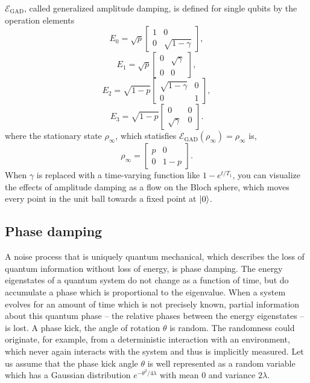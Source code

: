 \documentclass[11pt, oneside]{article}   	%
\begin{document}
$\mathcal{E}_{\textrm{GAD}}$, called generalized amplitude damping, is defined for single qubits by the operation elements
\begin{equation}
E_0 = \sqrt{p}
\begin{bmatrix}
1 & 0 \\
0 & \sqrt{1 - \gamma}
\end{bmatrix}, 
\end{equation}
\begin{equation}
E_1 = \sqrt{p}
\begin{bmatrix}
0 & \sqrt{\gamma} \\
0 & 0
\end{bmatrix},
\end{equation}
\begin{equation}
E_2 = \sqrt{1-p}
\begin{bmatrix}
\sqrt{1 - \gamma} & 0 \\
0 & 1
\end{bmatrix},
\end{equation}
\begin{equation}
E_3 = \sqrt{1-p}
\begin{bmatrix}
0 &0 \\
\sqrt{\gamma} & 0
\end{bmatrix}.
\end{equation}
where the stationary state $\rho_{\infty}$, which statisfies $\mathcal{E}_{\textrm{GAD}} (\rho_{\infty}) = \rho_{\infty}$ is,
\begin{equation}
\rho_{\infty} = 
\begin{bmatrix}
p &0 \\
0 & 1-p
\end{bmatrix}.
\end{equation}
When $\gamma$ is replaced with a time-varying function like $1-e^{t/T_1}$, you can visualize the effects of amplitude damping as a flow on the Bloch sphere, which moves every point in the unit ball towards a fixed point at $\ket{0}$.

\subsection{Phase damping}
A noise process that is uniquely quantum mechanical, which describes the loss of quantum information without loss of energy, is phase damping. 
The energy eigenstates of a quantum system do not change as a function of time, but do accumulate a phase which is proportional to the eigenvalue. 
When a system evolves for an amount of time which is not precisely known, partial information about this quantum phase -- the relative phases between the energy eigenstates -- is lost.
A phase kick, the angle of rotation $\theta$ is random. 
The randomness could originate, for example, from a deterministic interaction with an environment, which never again interacts with the system and thus is implicitly measured.
Let us assume that the phase kick angle $\theta$ is well represented as a random variable which has a Gaussian distribution 
$e^{- \theta^2/4 \lambda}$ 
with mean 0 and variance $2 \lambda$.
\end{document}
